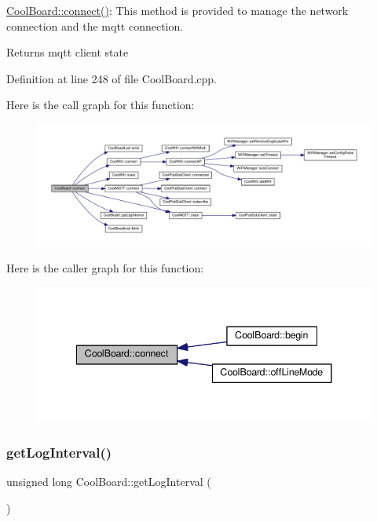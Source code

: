 \hyperlink{class_cool_board_a519de78b807f8ec6463ff484eb925918}{Cool\+Board\+::connect()}\+: This method is provided to manage the network connection and the mqtt connection.

\begin{DoxyReturn}{Returns}
mqtt client state 
\end{DoxyReturn}


Definition at line 248 of file Cool\+Board.\+cpp.

Here is the call graph for this function\+:
\nopagebreak
\begin{figure}[H]
\begin{center}
\leavevmode
\includegraphics[width=350pt]{class_cool_board_a519de78b807f8ec6463ff484eb925918_cgraph}
\end{center}
\end{figure}
Here is the caller graph for this function\+:
\nopagebreak
\begin{figure}[H]
\begin{center}
\leavevmode
\includegraphics[width=341pt]{class_cool_board_a519de78b807f8ec6463ff484eb925918_icgraph}
\end{center}
\end{figure}
\mbox{\label{class_cool_board_a7508e029f2ee17bb747ffab599285e0d}} 
\subsubsection{\texorpdfstring{get\+Log\+Interval()}{getLogInterval()}}
{\footnotesize\ttfamily unsigned long Cool\+Board\+::get\+Log\+Interval (\begin{DoxyParamCaption}{ }\end{DoxyParamCaption})}

